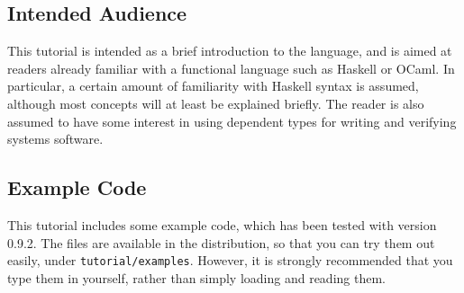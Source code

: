 \subsection{Intended Audience}

This tutorial is intended as a brief introduction to the language, and is aimed
at readers already familiar with a functional language such as Haskell or
OCaml. In particular, a certain amount of familiarity with Haskell syntax is
assumed, although most concepts will at least be explained briefly.  The reader
is also assumed to have some interest in using dependent types for writing and
verifying systems software.

\subsection{Example Code}

This tutorial includes some example code, which has been tested with \Idris{} version
0.9.2. The files are available in the \Idris{} distribution,
so that you can try them out easily,
under \texttt{tutorial/examples}. However, it is strongly recommended that you
type them in yourself, rather than simply loading and reading them.
